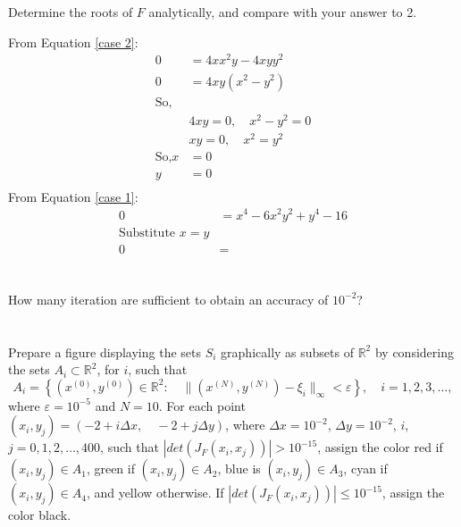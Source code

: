 \documentclass{article}
\begin{document}
\section{}
Determine the roots of $F$ analytically, and compare with your answer to 2.
\vspace{10mm}

From Equation \ref{case 2}:
\begin{align*}
    0 &= 4xx^2y-4xyy^2\\
    0 &= 4xy(x^2-y^2)\\
    \text{So,}&\\
    &4xy = 0, \quad x^2-y^2=0\\
    &xy=0,\quad x^2=y^2\\
    \text{So,}
    x&=0\\
    y&=0 \\
\end{align*}
From Equation \ref{case 1}:
\begin{align*}
    0 &= x^4-6x^2y^2+y^4-16\\
    \text{Substitute } x=y&\\
    0 &=
\end{align*}



\section{}
How many iteration are sufficient to obtain an accuracy of $10^{-2}$?
\vspace{10mm}

\section{}
Prepare a figure displaying the sets $S_i$ graphically as subsets of $\mathbb{R}^2$ by considering the sets $A_i \subset \mathbb{R}^2$, for $i$, such that
$$A_i= \left\{ (x^{(0)},y^{(0)})\in \mathbb{R}^2: \quad \parallel (x^{(N)},y^{(N)})-\xi_i \parallel_{\infty} < \varepsilon\right\}, \quad i=1,2,3,\dots ,$$
where $\varepsilon = 10^{-5}$ and $N=10$. For each point $(x_i,y_j)=(-2 + i \Delta x, \quad -2+j \Delta y)$, where $\Delta x = 10^{-2}$, $\Delta y = 10^{-2}$, $i$, $j=0,1,2,\dots , 400$, such that $|det(J_F(x_i,x_j))|> 10^{-15}$, assign the color red if $(x_i,y_j)\in A_1$, green if $(x_i,y_j)\in A_2$, blue is $(x_i,y_j)\in A_3$, cyan if $(x_i,y_j)\in A_4$, and yellow otherwise. If $|det(J_F(x_i,x_j))| \le 10^{-15}$, assign the color black.
\vspace{10mm}
\end{document}
